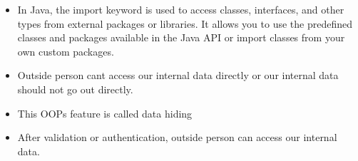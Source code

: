 \setlength{\columnsep}{3pt}
\begin{flushleft}

	\begin{itemize}
		\item In Java, the import keyword is used to access classes, interfaces, and other types from external packages or libraries. It allows you to use the predefined classes and packages available in the Java API or import classes from your own custom packages.
		
		
		\item Outside person cant access our internal data directly or our internal data should not go out directly.
		\item This OOPs feature is called data hiding
		\item After validation or authentication, outside person can access our internal data. 
		
	\end{itemize}	
	

	
\end{flushleft}

\newpage

